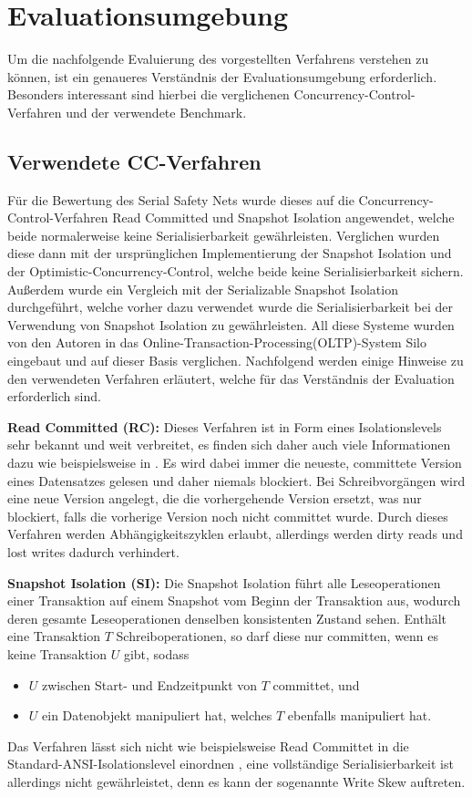 \section{Evaluationsumgebung}
Um die nachfolgende Evaluierung des vorgestellten Verfahrens verstehen zu können, ist ein genaueres Verständnis der Evaluationsumgebung erforderlich.
Besonders interessant sind hierbei die verglichenen Concurrency-Control-Verfahren und der verwendete Benchmark.

\subsection{Verwendete CC-Verfahren}
Für die Bewertung des Serial Safety Nets wurde dieses auf die Concurrency-Control-Verfahren Read Committed und Snapshot Isolation angewendet, welche beide normalerweise keine Serialisierbarkeit gewährleisten.
Verglichen wurden diese dann mit der ursprünglichen Implementierung der Snapshot Isolation und der Optimistic-Concurrency-Control, welche beide keine Serialisierbarkeit sichern.
Außerdem wurde ein Vergleich mit der Serializable Snapshot Isolation durchgeführt, welche vorher dazu verwendet wurde die Serialisierbarkeit bei der Verwendung von Snapshot Isolation zu gewährleisten.
All diese Systeme wurden von den Autoren in das Online-Transaction-Processing(OLTP)-System Silo eingebaut und auf dieser Basis verglichen.
Nachfolgend werden einige Hinweise zu den verwendeten Verfahren erläutert, welche für das Verständnis der Evaluation erforderlich sind.

\textbf{Read Committed (RC):} Dieses Verfahren ist in Form eines Isolationslevels sehr bekannt und weit verbreitet, es finden sich daher auch viele Informationen dazu wie beispielsweise in \cite{Berenson:1995}.
Es wird dabei immer die neueste, committete Version eines Datensatzes gelesen und daher niemals blockiert.
Bei Schreibvorgängen wird eine neue Version angelegt, die die vorhergehende Version ersetzt, was nur blockiert, falls die vorherige Version noch nicht committet wurde.
Durch dieses Verfahren werden Abhängigkeitszyklen erlaubt, allerdings werden dirty reads und lost writes \cite{Berenson:1995} dadurch verhindert.

\textbf{Snapshot Isolation (SI):} Die Snapshot Isolation führt alle Leseoperationen einer Transaktion auf einem Snapshot vom Beginn der Transaktion aus, wodurch deren gesamte Leseoperationen denselben konsistenten Zustand sehen.
Enthält eine Transaktion $T$ Schreiboperationen, so darf diese nur committen, wenn es keine Transaktion $U$ gibt, sodass 
\begin{itemize}
	\item $U$ zwischen Start- und Endzeitpunkt von $T$ committet, und
	\item $U$ ein Datenobjekt manipuliert hat, welches $T$ ebenfalls manipuliert hat.
\end{itemize}
Das Verfahren lässt sich nicht wie beispielsweise Read Committet in die Standard-ANSI-Isolationslevel einordnen \cite{Adya:2000}, eine vollständige Serialisierbarkeit ist allerdings nicht gewährleistet, denn es kann der sogenannte Write Skew auftreten.


